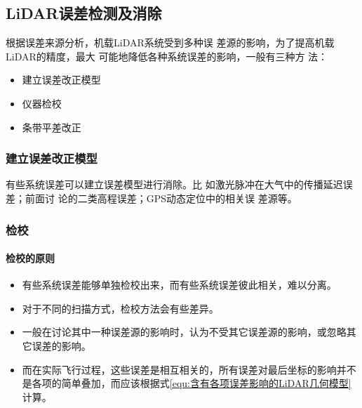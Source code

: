 \subsection{LiDAR误差检测及消除}
根据误差来源分析，机载LiDAR系统受到多种误
差源的影响，为了提高机载LiDAR的精度，最大
可能地降低各种系统误差的影响，一般有三种方
法：
\begin{itemize}
	\item 建立误差改正模型
	\item 仪器检校
	\item 条带平差改正
\end{itemize}

\subsubsection{建立误差改正模型}
有些系统误差可以建立误差模型进行消除。比
如激光脉冲在大气中的传播延迟误差；前面讨
论的二类高程误差；GPS动态定位中的相关误
差源等。

\subsubsection{检校}
\paragraph{检校的原则}
\begin{itemize}
	\item 有些系统误差能够单独检校出来，而有些系统误差彼此相关，难以分离。
	\item 对于不同的扫描方式，检校方法会有些差异。
	\item 一般在讨论其中一种误差源的影响时，认为不受其它误差源的影响，或忽略其它误差的影响。
	\item 而在实际飞行过程，这些误差是相互相关的，所有误差对最后坐标的影响并不是各项的简单叠加，而应该根据式\eqref{equ:含有各项误差影响的LiDAR几何模型}计算。
\end{itemize}

